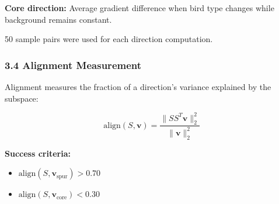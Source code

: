 \textbf{Core direction:} Average gradient difference when bird type changes while background remains constant.

50 sample pairs were used for each direction computation.

\subsubsection{3.4 Alignment Measurement}

Alignment measures the fraction of a direction's variance explained by the subspace:

$$\text{align}(S, \mathbf{v}) = \frac{\| S S^T \mathbf{v} \|_2^2}{\| \mathbf{v} \|_2^2}$$

\textbf{Success criteria:}
\begin{itemize}
\item $\text{align}(S, \mathbf{v}_{\text{spur}}) > 0.70$
\item $\text{align}(S, \mathbf{v}_{\text{core}}) < 0.30$
\end{itemize}

